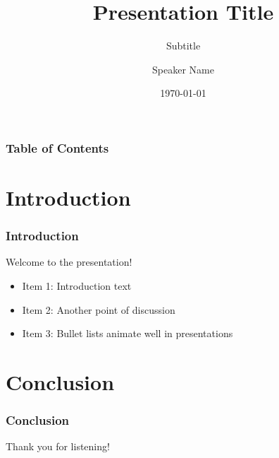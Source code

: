 \documentclass{beamer}
\title{Presentation Title}
\subtitle{Subtitle}
\author{Speaker Name}
\institute{Big Data Club (BDC)}
\date{\today}
\begin{document}
\frame{\titlepage}

\begin{frame}
\frametitle{Table of Contents}
\tableofcontents
\end{frame}

\section{Introduction}
\begin{frame}
\frametitle{Introduction}
Welcome to the presentation!
\begin{itemize}
    \item Item 1: Introduction text
    \item Item 2: Another point of discussion
    \item Item 3: Bullet lists animate well in presentations
\end{itemize}
\end{frame}

\section{Conclusion}
\begin{frame}
\frametitle{Conclusion}
Thank you for listening!
\end{frame}
\end{document}
